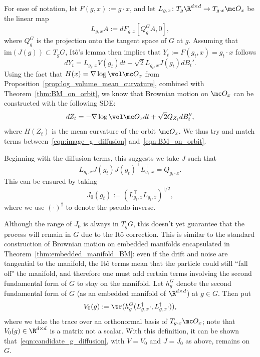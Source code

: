 \documentclass[twoside,a4paper,11pt]{article}
\theoremstyle{plain}
\begin{document}
For ease of notation, let $F(g, x) := g \cdot x$,
and let $L_{g, x} \colon T_g\R^{d \times d}
\to T_{g \cdot x} \mc O_x$ be
the linear map
\begin{equation}\label{eqn:Lgx_defn}
L_{g, x}A := dF_{g, x}[Q_{g}^GA, 0],
\end{equation}
where $Q_g^G$ is the projection
onto the tangent space of $G$ at $g$.
Assuming that $\mathrm{im}(J(g)) \subset T_gG$,
Itô's lemma then implies that
 $Y_t := F(g_t, x) = g_t \cdot x$ follows
\begin{equation}\label{eqn:image_g_diffusion}
dY_t = L_{g_t, x}V(g_t)dt + \sqrt{2}L_{g_t, x}J(g_t)dB_t'.
\end{equation}
Using the fact that $H(x) = \nabla \log \vol \mc O_x$
from Proposition~\ref{prop:log_volume_mean_curvature},
combined with Theorem~\ref{thm:BM_on_orbit},
we know that
Brownian motion on $\mc O_x$ can be
constructed with the following SDE:
\begin{equation}\label{eqn:BM_on_orbit}
dZ_t = -\nabla \log \vol \mc O_x dt + \sqrt{2}Q_{Z_t} dB_t'',
\end{equation} where $H(Z_t)$ is the mean curvature
of the orbit $\mc O_x$.
We thus try and match terms between~\eqref{eqn:image_g_diffusion}
and~\eqref{eqn:BM_on_orbit}.

Beginning with the diffusion terms, this suggests we take
$J$ such that
$$
L_{g_t, x}J(g_t)J(g_t)^\top L_{g_t, x}^\top = Q_{g_t \cdot x}.
$$ 
This can be ensured by taking
$$
J_0(g_t) := (L_{g_t, x}^\top L_{g_t,x})^{\dagger/2},
$$ where we use $(\cdot)^{\dagger}$ to denote the 
pseudo-inverse. 

Although the range of $J_0$ is always
in $T_gG$, this doesn't yet guarantee
that the process will remain in $G$ due
to the Itô correction.
This is similar to the standard construction of Brownian
motion on embedded manifolds encapsulated
in Theorem~\ref{thm:embedded_manifold_BM}: even if the drift
and noise are tangential to the manifold, the Itô terms mean
that the particle could still ``fall off" the manifold,
and therefore
one must add certain 
terms involving the second fundamental form of $G$ to stay on the manifold.
Let $h^G_g$ denote the second fundamental form of $G$ (as an embedded
manifold of $\R^{d \times d}$) at $g \in G$. Then put
$$
V_0(g) := \tr(h^G_{g}( L_{g, x}^{\dagger}\cdot, L_{g, x}^{\dagger}\cdot)),
$$ where we take the trace over an orthonormal basis of $T_{g \cdot x}\mc O_x$; note that $V_0(g) \in \R^{d\times d}$
is a matrix not a scalar.
With this definition, it can be shown that~\eqref{eqn:candidate_g_diffusion},
with $V = V_0$ and $J = J_0$ as above, remains on $G$. 
\end{document}
